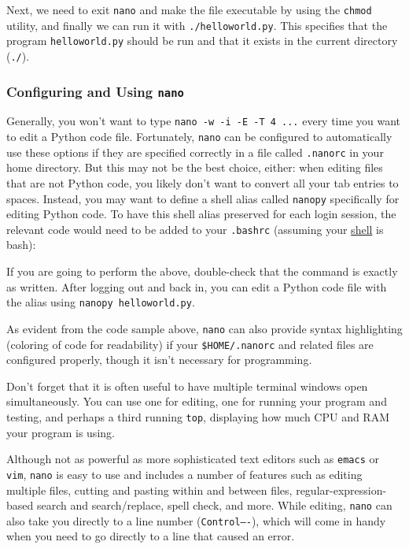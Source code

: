 \documentclass[
]{memoir}
\begin{document}
Next, we need to exit \texttt{nano} and make the file executable by using the \texttt{chmod} utility, and finally we can run it with \texttt{./helloworld.py}. This specifies that the program \texttt{helloworld.py} should be run and that it exists in the current directory (\texttt{./}).

\hypertarget{configuring-and-using-nano}{%
\subsubsection*{\texorpdfstring{Configuring and Using \texttt{nano}}{Configuring and Using nano}}\label{configuring-and-using-nano}}

Generally, you won't want to type \texttt{nano\ -w\ -i\ -E\ -T\ 4\ ...} every time you want to edit a Python code file. Fortunately, \texttt{nano} can be configured to automatically use these options if they are specified correctly in a file called \texttt{.nanorc} in your home directory. But this may not be the best choice, either: when editing files that are not Python code, you likely don't want to convert all your tab entries to spaces. Instead, you may want to define a shell alias called \texttt{nanopy} specifically for editing Python code. To have this shell alias preserved for each login session, the relevant code would need to be added to your \texttt{.bashrc} (assuming your \protect\hyperlink{shell_def}{shell} is bash):

If you are going to perform the above, double-check that the command is exactly as written. After logging out and back in, you can edit a Python code file with the alias using \texttt{nanopy\ helloworld.py}.

As evident from the code sample above, \texttt{nano} can also provide syntax highlighting (coloring of code for readability) if your \texttt{\$HOME/.nanorc} and related files are configured properly, though it isn't necessary for programming.

Don't forget that it is often useful to have multiple terminal windows open simultaneously. You can use one for editing, one for running your program and testing, and perhaps a third running \texttt{top}, displaying how much CPU and RAM your program is using.

Although not as powerful as more sophisticated text editors such as \texttt{emacs} or \texttt{vim}, \texttt{nano} is easy to use and includes a number of features such as editing multiple files, cutting and pasting within and between files, regular-expression-based search and search/replace, spell check, and more. While editing, \texttt{nano} can also take you directly to a line number (\texttt{Control–-}), which will come in handy when you need to go directly to a line that caused an error.
\end{document}
